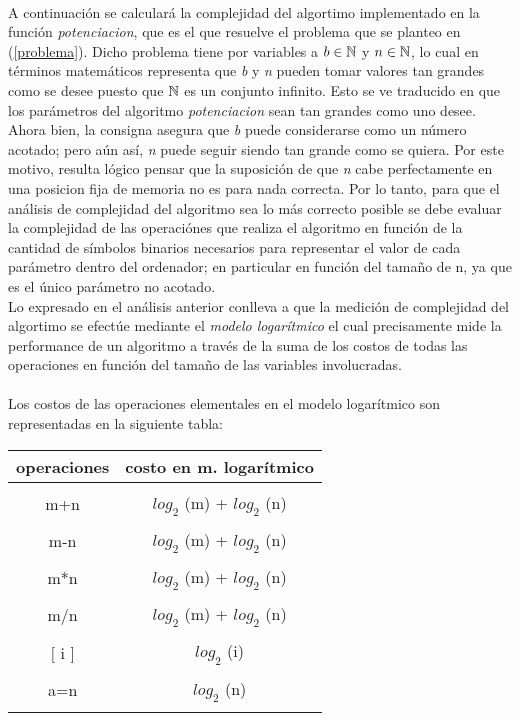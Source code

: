 {\paragraph{}
A continuación se calculará la complejidad del algortimo implementado en la función \textit{potenciacion}, que es el que resuelve el problema que se planteo en (\ref{problema}). Dicho problema tiene por variables a $b \in \mathbb{N}$ y $n \in \mathbb{N}$, lo cual en términos matemáticos representa que \textit{b} y \textit{n} pueden tomar valores tan grandes como se desee puesto que $\mathbb{N}$ es un conjunto infinito. Esto se ve traducido en que los parámetros del algoritmo \textit{potenciacion} sean tan grandes como uno desee. \\
Ahora bien, la consigna asegura que \textit{b} puede considerarse como un número acotado; pero aún así, \textit{n} puede seguir siendo tan grande como se quiera. Por este motivo, resulta lógico pensar que la suposición de que \textit{n} cabe perfectamente en una posicion fija de memoria no es para nada correcta. Por lo tanto, para que el análisis de complejidad del algoritmo sea lo más correcto posible se debe evaluar la complejidad de las operaciónes que realiza el algoritmo en función de la cantidad de símbolos binarios necesarios para representar el valor de cada parámetro dentro del ordenador; en particular en función del tamaño de n, ya que es el único parámetro no acotado.\\
Lo expresado en el análisis anterior conlleva a que la medición de complejidad del algortimo se efectúe mediante el \textit{modelo logarítmico} el cual precisamente mide la performance de un algoritmo a través de la suma de los costos de todas las operaciones en función del tamaño de las variables involucradas.

\paragraph{}
Los costos de las operaciones elementales en el modelo logarítmico son representadas en la siguiente tabla: \\
	\begin{center}
		\begin{tabular}{|c|c|}
			\hline
			operaciones & costo en m. logarítmico \\ 
			\hline
			& \\
			m+n & $log_2$ (m) + $log_2$ (n) \\
			& \\
			m-n & $log_2$ (m) + $log_2$ (n) \\
			& \\
			m*n & $log_2$ (m) + $log_2$ (n) \\
			& \\
			m/n & $log_2$ (m) + $log_2$ (n) \\
			& \\
			$[$ i $]$ & $log_2$ (i) \\
			& \\
			a=n & $log_2$ (n) \\
			& \\
			\hline
		\end{tabular} 
	\end{center}

}
